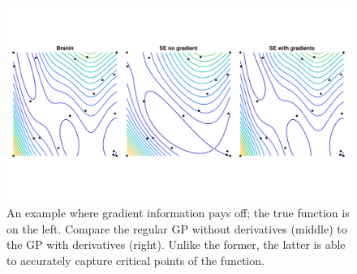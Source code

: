 \begin{figure}[ht]
  \begin{center}
    \includegraphics[width=\textwidth]{./sgpd/pics/branin}
    \caption{An example where gradient information pays off; the true function
    is on the left. Compare the regular GP without derivatives (middle) to the
    GP with derivatives (right). Unlike the former, the latter is able to
    accurately capture critical points of the function.}\label{fig:branin}
  \end{center}
\end{figure}